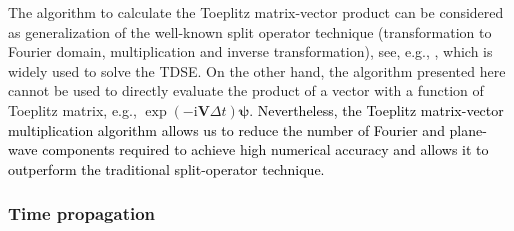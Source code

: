 \documentclass[
pra%
,preprint%
,amssymb, nobibnotes, aps, superscriptaddress, floatfix]{revtex4}
\renewcommand{\imath}{\mathrm{i}}
\newcommand{\Vmat}{\mathbf{V}}
\newcommand{\Pvec}{\boldsymbol{\psi}}
\newcommand{\editt}[1]{\textcolor{black}{#1}}
\newcommand{\hide}[1]{}
\begin{document}
The algorithm to calculate the Toeplitz matrix-vector product can be considered as generalization of the well-known split operator technique (transformation to Fourier domain, multiplication and inverse transformation), see, e.g., \cite{Kosloff1988}, which is widely used to solve the TDSE. On the other hand, the algorithm presented here cannot be used to directly evaluate the product of a vector with a function of Toeplitz matrix, e.g., $ \exp(-\imath \Vmat \Delta t) \Pvec$. \hide{Nevertheless, our implementation reduces the number of Fourier and plane-wave components required to achieve high numerical accuracy. Therefore, for finite systems or truncated bases the Toeplitz matrix-vector multiplication algorithm outperforms the traditional split-operator technique.}
\editt{Nevertheless, the Toeplitz matrix-vector multiplication algorithm allows us to reduce the number of Fourier and plane-wave components required to achieve high numerical accuracy and allows it to outperform the traditional split-operator technique.}

\subsubsection{Time propagation}
\end{document}

